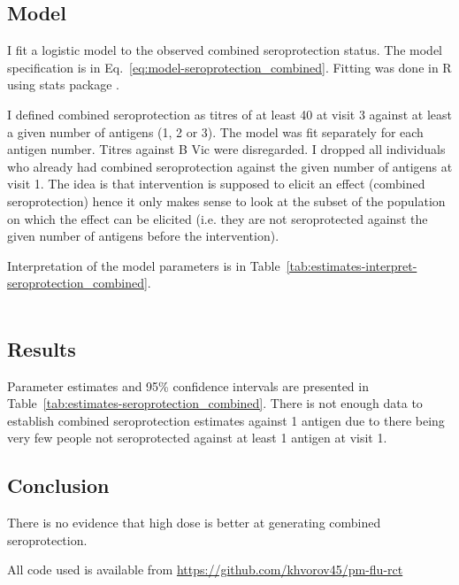 \documentclass[11pt]{article}
\begin{document}
\subsection{Model}

I fit a logistic model to the observed combined seroprotection status.
The model specification is in Eq.~\ref{eq:model-seroprotection_combined}.
Fitting was done in R using stats package \cite{R}.

I defined combined seroprotection as titres of at least 40 at visit 3 against
at least a given number of antigens (1, 2 or 3). The model was fit separately
for each antigen number.
Titres against B Vic were disregarded.
I dropped all individuals who already had combined seroprotection against
the given number of antigens at visit 1.
The idea is that intervention is supposed to elicit an effect
(combined seroprotection)
hence it only makes sense to look at the subset of the population on which
the effect can be elicited
(i.e. they are not seroprotected against the given number of antigens
before the intervention).

Interpretation of the model parameters is in
Table~\ref{tab:estimates-interpret-seroprotection_combined}.

\begin{equation}
    \begin{gathered}
        \label{eq:model-seroprotection_combined}
        
    \end{gathered}
\end{equation}





\subsection{Results}

Parameter estimates and 95\% confidence intervals
are presented in Table~\ref{tab:estimates-seroprotection_combined}.
There is not enough data to establish combined seroprotection
estimates against 1 antigen due to there being very few people
not seroprotected against at least 1 antigen at visit 1.



\subsection{Conclusion}

There is no evidence that high dose is better at generating combined
seroprotection.



All code used is available from \url{https://github.com/khvorov45/pm-flu-rct}
\end{document}
